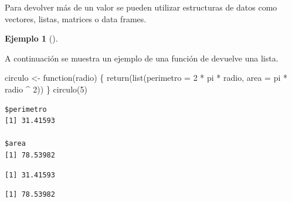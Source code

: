 \documentclass[
  a4paper,
]{scrreport}
\newenvironment{Shaded}{\begin{snugshade}}{\end{snugshade}}
\newcommand{\AttributeTok}[1]{\textcolor[rgb]{0.40,0.45,0.13}{#1}}
\newcommand{\ControlFlowTok}[1]{\textcolor[rgb]{0.00,0.23,0.31}{#1}}
\newcommand{\DecValTok}[1]{\textcolor[rgb]{0.68,0.00,0.00}{#1}}
\newcommand{\FunctionTok}[1]{\textcolor[rgb]{0.28,0.35,0.67}{#1}}
\newcommand{\NormalTok}[1]{\textcolor[rgb]{0.00,0.23,0.31}{#1}}
\newcommand{\OtherTok}[1]{\textcolor[rgb]{0.00,0.23,0.31}{#1}}
\newcommand{\SpecialCharTok}[1]{\textcolor[rgb]{0.37,0.37,0.37}{#1}}
\theoremstyle{definition}
\newtheorem{example}{Ejemplo}[chapter]
\theoremstyle{definition}
\theoremstyle{remark}
\begin{document}
Para devolver más de un valor se pueden utilizar estructuras de datos
como vectores, listas, matrices o data frames.

\leavevmode{}%
\begin{example}[]\label{exm-retorno-funcion-lista}

A continuación se muestra un ejemplo de una función de devuelve una
lista.

\begin{Shaded}
\begin{Highlighting}[]
\NormalTok{circulo }\OtherTok{\textless{}{-}} \ControlFlowTok{function}\NormalTok{(radio) \{}
  \FunctionTok{return}\NormalTok{(}\FunctionTok{list}\NormalTok{(}\AttributeTok{perimetro =} \DecValTok{2} \SpecialCharTok{*}\NormalTok{ pi }\SpecialCharTok{*}\NormalTok{ radio, }\AttributeTok{area =}\NormalTok{ pi }\SpecialCharTok{*}\NormalTok{ radio }\SpecialCharTok{\^{}} \DecValTok{2}\NormalTok{))}
\NormalTok{\}}
\FunctionTok{circulo}\NormalTok{(}\DecValTok{5}\NormalTok{)}
\end{Highlighting}
\end{Shaded}

\begin{verbatim}
$perimetro
[1] 31.41593

$area
[1] 78.53982
\end{verbatim}

\begin{Shaded}
\end{Shaded}

\begin{verbatim}
[1] 31.41593
\end{verbatim}

\begin{Shaded}
\end{Shaded}

\begin{verbatim}
[1] 78.53982
\end{verbatim}

\end{example}
\end{document}
